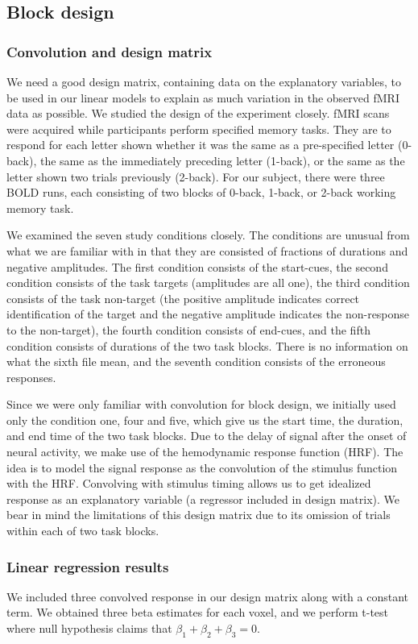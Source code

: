 \documentclass[11pt]{article} \usepackage{graphicx} \graphicspath{ {images/} }
\begin{document}
\subsection{Block design}
\subsubsection{Convolution and design matrix}
We need a good design matrix, containing data on the explanatory variables, to
be used in our linear models to explain as much variation in the observed fMRI
data as possible. We studied the design of the experiment closely. fMRI scans were
acquired while participants perform specified memory tasks. They are to respond
for each letter shown whether it was the same as a pre-specified letter
(0-back), the same as the immediately preceding letter (1-back), or the same as
the letter shown two trials previously (2-back). For our subject, there were
three BOLD runs, each consisting of two blocks of 0-back, 1-back, or 2-back
working memory task. 

We examined the seven study conditions closely. The conditions are unusual from
what we are familiar with in that they are consisted of fractions of durations
and negative amplitudes. The first condition consists of
the start-cues, the second condition consists of the task targets (amplitudes
are all one), the third condition consists of the task non-target (the positive amplitude indicates
correct identification of the target and the negative amplitude indicates the
non-response to the non-target), the fourth condition consists of end-cues, and
the fifth condition consists of durations of the two task blocks. There is no
information on what the sixth file mean, and the seventh condition consists of
the erroneous responses.

Since we were only familiar with convolution for block design, we initially used
only the condition one, four and five, which give us the start time, the
duration, and end time of the two task blocks. Due to the delay of signal after
the onset of neural activity, we make use of the hemodynamic response
function (HRF). The idea is to model the signal response as the convolution of
the stimulus function with the HRF. Convolving with stimulus timing allows us to
get idealized response as an explanatory variable (a regressor included in
design matrix). We bear in mind the limitations of this
design matrix due to its omission of trials within each of two task blocks. 

\subsubsection{Linear regression results}
We included three convolved response in our design matrix along with a constant
term. We obtained three beta estimates for each voxel, and we perform t-test
where null hypothesis claims that $\beta_1 + \beta_2 + \beta_3 = 0$. 
\end{document}
